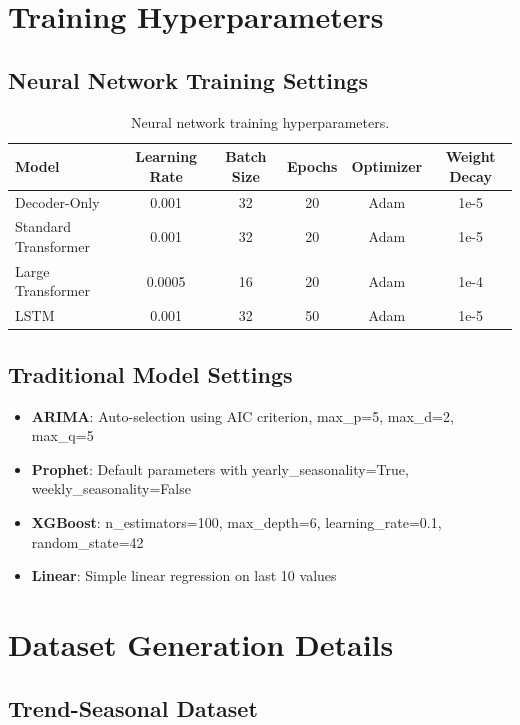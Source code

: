 \documentclass[11pt]{article}
\begin{document}
\section{Training Hyperparameters}

\subsection{Neural Network Training Settings}

\begin{table}[h]
\centering
\begin{tabular}{@{}lccccc@{}}
\toprule
Model & Learning Rate & Batch Size & Epochs & Optimizer & Weight Decay \\
\midrule
Decoder-Only & 0.001 & 32 & 20 & Adam & 1e-5 \\
Standard Transformer & 0.001 & 32 & 20 & Adam & 1e-5 \\
Large Transformer & 0.0005 & 16 & 20 & Adam & 1e-4 \\
LSTM & 0.001 & 32 & 50 & Adam & 1e-5 \\
\bottomrule
\end{tabular}
\caption{Neural network training hyperparameters.}
\end{table}

\subsection{Traditional Model Settings}

\begin{itemize}
\item \textbf{ARIMA}: Auto-selection using AIC criterion, max\_p=5, max\_d=2, max\_q=5
\item \textbf{Prophet}: Default parameters with yearly\_seasonality=True, weekly\_seasonality=False
\item \textbf{XGBoost}: n\_estimators=100, max\_depth=6, learning\_rate=0.1, random\_state=42
\item \textbf{Linear}: Simple linear regression on last 10 values
\end{itemize}

\section{Dataset Generation Details}

\subsection{Trend-Seasonal Dataset}
\end{document}
